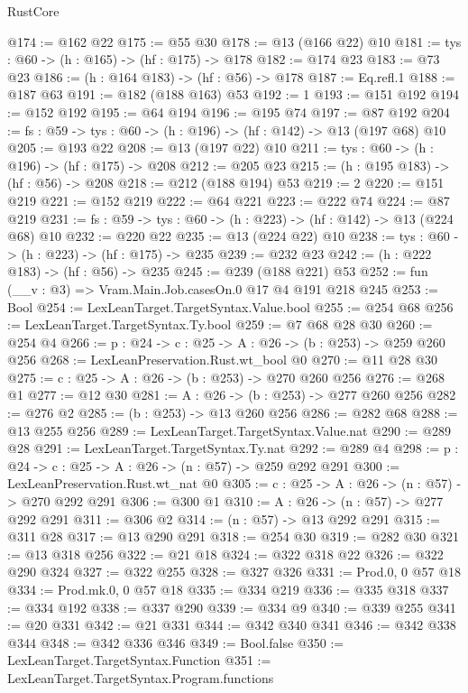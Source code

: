 \begin{lexlean}{RustCore}
\begin{coremodule}
@174 := @162 @22
@175 := @55 @30
@178 := @13 (@166 @22) @10
@181 := {tys : @60} -> (h : @165) -> (hf : @175) -> @178
@182 := @174 @23
@183 := @73 @23
@186 := (h : @164 @183) -> (hf : @56) -> @178
@187 := Eq.refl.{1}
@188 := @187 @63
@191 := @182 (@188 @163) @53
@192 := 1
@193 := @151 @192
@194 := @152 @192
@195 := @64 @194
@196 := @195 @74
@197 := @87 @192
@204 := {fs : @59} -> {tys : @60} -> (h : @196) -> (hf : @142) -> @13 (@197 @68) @10
@205 := @193 @22
@208 := @13 (@197 @22) @10
@211 := {tys : @60} -> (h : @196) -> (hf : @175) -> @208
@212 := @205 @23
@215 := (h : @195 @183) -> (hf : @56) -> @208
@218 := @212 (@188 @194) @53
@219 := 2
@220 := @151 @219
@221 := @152 @219
@222 := @64 @221
@223 := @222 @74
@224 := @87 @219
@231 := {fs : @59} -> {tys : @60} -> (h : @223) -> (hf : @142) -> @13 (@224 @68) @10
@232 := @220 @22
@235 := @13 (@224 @22) @10
@238 := {tys : @60} -> (h : @223) -> (hf : @175) -> @235
@239 := @232 @23
@242 := (h : @222 @183) -> (hf : @56) -> @235
@245 := @239 (@188 @221) @53
@252 := fun (__v : @3) => Vram.Main.Job.casesOn.{0} @17 @4 @191 @218 @245
@253 := Bool
@254 := LexLeanTarget.TargetSyntax.Value.bool
@255 := @254 @68
@256 := LexLeanTarget.TargetSyntax.Ty.bool
@259 := @7 @68 @28 @30
@260 := @254 @4
@266 := {p : @24} -> {c : @25} -> {A : @26} -> (b : @253) -> @259 @260 @256
@268 := LexLeanPreservation.Rust.wt_bool @0
@270 := @11 @28 @30
@275 := {c : @25} -> {A : @26} -> (b : @253) -> @270 @260 @256
@276 := @268 @1
@277 := @12 @30
@281 := {A : @26} -> (b : @253) -> @277 @260 @256
@282 := @276 @2
@285 := (b : @253) -> @13 @260 @256
@286 := @282 @68
@288 := @13 @255 @256
@289 := LexLeanTarget.TargetSyntax.Value.nat
@290 := @289 @28
@291 := LexLeanTarget.TargetSyntax.Ty.nat
@292 := @289 @4
@298 := {p : @24} -> {c : @25} -> {A : @26} -> (n : @57) -> @259 @292 @291
@300 := LexLeanPreservation.Rust.wt_nat @0
@305 := {c : @25} -> {A : @26} -> (n : @57) -> @270 @292 @291
@306 := @300 @1
@310 := {A : @26} -> (n : @57) -> @277 @292 @291
@311 := @306 @2
@314 := (n : @57) -> @13 @292 @291
@315 := @311 @28
@317 := @13 @290 @291
@318 := @254 @30
@319 := @282 @30
@321 := @13 @318 @256
@322 := @21 @18
@324 := @322 @318 @22
@326 := @322 @290 @324
@327 := @322 @255
@328 := @327 @326
@331 := Prod.{0, 0} @57 @18
@334 := Prod.mk.{0, 0} @57 @18
@335 := @334 @219
@336 := @335 @318
@337 := @334 @192
@338 := @337 @290
@339 := @334 @9
@340 := @339 @255
@341 := @20 @331
@342 := @21 @331
@344 := @342 @340 @341
@346 := @342 @338 @344
@348 := @342 @336 @346
@349 := Bool.false
@350 := LexLeanTarget.TargetSyntax.Function
@351 := LexLeanTarget.TargetSyntax.Program.functions

\end{coremodule}
\end{lexlean}

